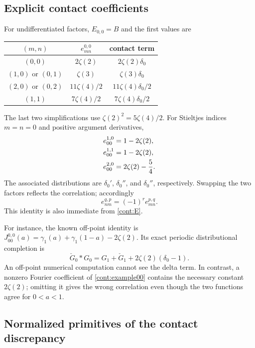 \subsection{Explicit contact coefficients}

For undifferentiated factors, $E_{0,0}=B$ and the first values are
\begin{center}
\begin{tabular}{c c c}
\toprule
$(m,n)$ & $e_{mn}^{0,0}$ & contact term\\
\midrule
$(0,0)$ & $2\zeta(2)$ & $2\zeta(2)\delta_0$\\
$(1,0)$ or $(0,1)$ & $\zeta(3)$ & $\zeta(3)\delta_0$\\
$(2,0)$ or $(0,2)$ & $11\zeta(4)/2$ & $11\zeta(4)\delta_0/2$\\
$(1,1)$ & $7\zeta(4)/2$ & $7\zeta(4)\delta_0/2$\\
\bottomrule
\end{tabular}
\end{center}
The last two simplifications use $\zeta(2)^2=5\zeta(4)/2$.
For Stieltjes indices $m=n=0$ and positive argument derivatives,
\begin{align}
 e_{00}^{1,0}&=1-2\zeta(2),\notag\\
 e_{00}^{1,1}&=1-2\zeta(2),\notag\\
 e_{00}^{2,0}&=2\zeta(2)-\frac54.
 \label{cont:low-examples}
\end{align}
The associated distributions are $\delta_0'$, $\delta_0''$, and
$\delta_0''$, respectively.  Swapping the two factors reflects the
correlation; accordingly
\begin{equation}\label{cont:reflection}
 e_{nm}^{q,p}=(-1)^r e_{mn}^{p,q}.
\end{equation}
This identity is also immediate from \eqref{cont:E}.

For instance, the known off-point identity is
$J_{00}^{0,0}(a)=\gamma_1(a)+\gamma_1(1-a)-2\zeta(2)$.
Its exact periodic distributional completion is
\begin{equation}\label{cont:example00}
 \check G_0*G_0=G_1+\check G_1+2\zeta(2)(\delta_0-1).
\end{equation}
An off-point numerical computation cannot see the delta term.
In contrast, a nonzero Fourier coefficient of \eqref{cont:example00}
contains the necessary constant $2\zeta(2)$; omitting it gives the
wrong correlation even though the two functions agree for $0<a<1$.

\subsection{Normalized primitives of the contact discrepancy}

